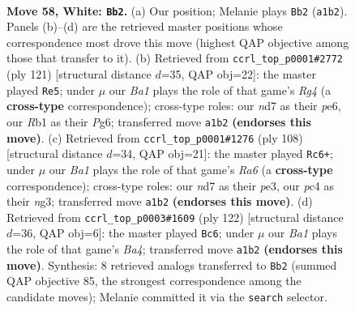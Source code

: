 \documentclass[11pt]{article}
\begin{document}
\clearpage

\begin{figure}[p]\centering
\begin{subfigure}{0.46\textwidth}\centering
\resizebox{\linewidth}{!}{%
\newchessgame
\chessboard[
  setfen={7k/3n4/6P1/4r3/p1p2K2/P1P4p/2P4P/BR6 w - - 5 58},
  showmover=false,
  pgfstyle=straightmove, color=movearrow, markmove={a1-b2}
]}
\caption{}
\end{subfigure}\hfill
\begin{subfigure}{0.46\textwidth}\centering
\resizebox{\linewidth}{!}{%
\newchessgame
\chessboard[
  setfen={6k1/5R2/4P1p1/p2p2r1/P1p5/2P4K/8/8 b - - 2 61},
  showmover=false,
  pgfstyle=straightmove, color=movearrow, markmove={g5-e5}
]}
\caption{}
\end{subfigure}
\\[4pt]
\begin{subfigure}{0.46\textwidth}\centering
\resizebox{\linewidth}{!}{%
\newchessgame
\chessboard[
  setfen={8/7P/R7/P1k3p1/2p3P1/2P1p1n1/5r2/6K1 w - - 1 55},
  showmover=false,
  pgfstyle=straightmove, color=movearrow, markmove={a6-c6}
]}
\caption{}
\end{subfigure}\hfill
\begin{subfigure}{0.46\textwidth}\centering
\resizebox{\linewidth}{!}{%
\newchessgame
\chessboard[
  setfen={8/5p2/3n4/R4P2/B1p2k2/8/PPP1K3/7r w - - 1 62},
  showmover=false,
  pgfstyle=straightmove, color=movearrow, markmove={a4-c6}
]}
\caption{}
\end{subfigure}
\caption{\textbf{Move 58, White: \texttt{Bb2}.} (a) Our position; Melanie plays \texttt{Bb2} (\texttt{a1b2}). Panels (b)--(d) are the retrieved master positions whose correspondence most drove this move (highest QAP objective among those that transfer to it). (b) Retrieved from \texttt{ccrl\_top\_p0001\#2772} (ply 121) [structural distance $d$=35, QAP obj=22]: the master played \texttt{Re5}; under $\mu$ our \emph{Ba1} plays the role of that game's \emph{Rg4} (a \textbf{cross-type} correspondence); cross-type roles: our \emph{n}d7 as their \emph{p}e6, our \emph{R}b1 as their \emph{P}g6; transferred move \texttt{a1b2} \textbf{(endorses this move)}. (c) Retrieved from \texttt{ccrl\_top\_p0001\#1276} (ply 108) [structural distance $d$=34, QAP obj=21]: the master played \texttt{Rc6+}; under $\mu$ our \emph{Ba1} plays the role of that game's \emph{Ra6} (a \textbf{cross-type} correspondence); cross-type roles: our \emph{n}d7 as their \emph{p}e3, our \emph{p}c4 as their \emph{n}g3; transferred move \texttt{a1b2} \textbf{(endorses this move)}. (d) Retrieved from \texttt{ccrl\_top\_p0003\#1609} (ply 122) [structural distance $d$=36, QAP obj=6]: the master played \texttt{Bc6}; under $\mu$ our \emph{Ba1} plays the role of that game's \emph{Ba4}; transferred move \texttt{a1b2} \textbf{(endorses this move)}. Synthesis: 8 retrieved analogs transferred to \texttt{Bb2} (summed QAP objective 85, the strongest correspondence among the candidate moves); Melanie committed it via the \texttt{search} selector.}
\label{fig:thought-m114}
\end{figure}
\end{document}
